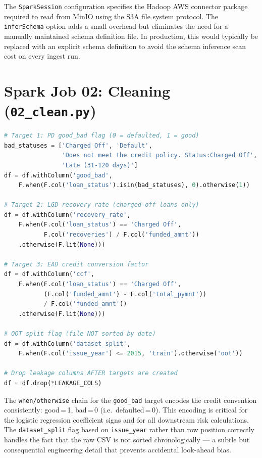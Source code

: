 \documentclass[12pt,a4paper]{report}
\begin{document}
\medskip
\noindent The \texttt{SparkSession} configuration specifies the Hadoop AWS connector package required to read from MinIO using the S3A file system protocol. The \texttt{inferSchema} option adds a small overhead but eliminates the need for a manually maintained schema definition file. In production, this would typically be replaced with an explicit schema definition to avoid the schema inference scan cost on every ingest run.

\section{Spark Job 02: Cleaning (\texttt{02\_clean.py})}

\begin{lstlisting}[language=Python, caption={Target variable creation and OOT split}]
# Target 1: PD good_bad flag (0 = defaulted, 1 = good)
bad_statuses = ['Charged Off', 'Default',
                'Does not meet the credit policy. Status:Charged Off',
                'Late (31-120 days)']
df = df.withColumn('good_bad',
    F.when(F.col('loan_status').isin(bad_statuses), 0).otherwise(1))

# Target 2: LGD recovery rate (charged-off loans only)
df = df.withColumn('recovery_rate',
    F.when(F.col('loan_status') == 'Charged Off',
           F.col('recoveries') / F.col('funded_amnt'))
    .otherwise(F.lit(None)))

# Target 3: EAD credit conversion factor
df = df.withColumn('ccf',
    F.when(F.col('loan_status') == 'Charged Off',
           (F.col('funded_amnt') - F.col('total_pymnt'))
           / F.col('funded_amnt'))
    .otherwise(F.lit(None)))

# OOT split flag (file NOT sorted by date)
df = df.withColumn('dataset_split',
    F.when(F.col('issue_year') <= 2015, 'train').otherwise('oot'))

# Drop leakage columns AFTER targets are created
df = df.drop(*LEAKAGE_COLS)
\end{lstlisting}

\medskip
\noindent The \texttt{when/otherwise} chain for the \texttt{good\_bad} target encodes the credit convention consistently: good\,=\,1, bad\,=\,0 (i.e.\ defaulted\,=\,0). This encoding is critical for the logistic regression coefficient signs and for all downstream risk calculations. The \texttt{dataset\_split} flag based on \texttt{issue\_year} rather than row position correctly handles the fact that the raw CSV is not sorted chronologically --- a subtle but consequential engineering detail that prevents accidental look-ahead bias.
\end{document}
